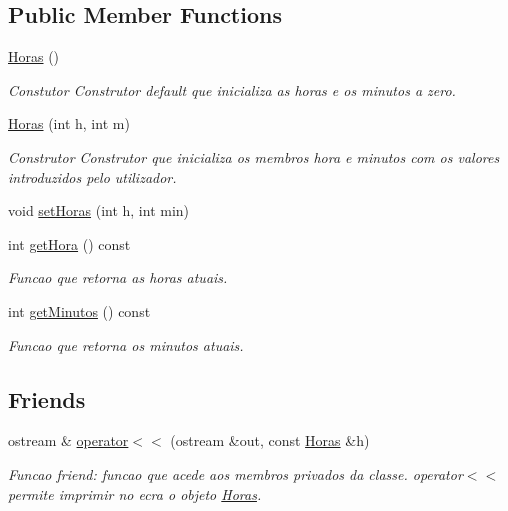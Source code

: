 \subsection*{Public Member Functions}
\begin{DoxyCompactItemize}
\item 
\hypertarget{class_horas_aeef70cbde1c7253dfbb2135fbadc483b}{}\hyperlink{class_horas_aeef70cbde1c7253dfbb2135fbadc483b}{Horas} ()\label{class_horas_aeef70cbde1c7253dfbb2135fbadc483b}

\begin{DoxyCompactList}\small\item\em Constutor Construtor default que inicializa as horas e os minutos a zero. \end{DoxyCompactList}\item 
\hypertarget{class_horas_abbbba3d917352ba3350cafe29753c60f}{}\hyperlink{class_horas_abbbba3d917352ba3350cafe29753c60f}{Horas} (int h, int m)\label{class_horas_abbbba3d917352ba3350cafe29753c60f}

\begin{DoxyCompactList}\small\item\em Construtor Construtor que inicializa os membros hora e minutos com os valores introduzidos pelo utilizador. \end{DoxyCompactList}\item 
void \hyperlink{class_horas_a5da58fcd1a263e3c97e6e11c35b61d76}{set\+Horas} (int h, int min)
\item 
int \hyperlink{class_horas_af72b7e4e7206236f8dc9a4d4b68eff0c}{get\+Hora} () const 
\begin{DoxyCompactList}\small\item\em Funcao que retorna as horas atuais. \end{DoxyCompactList}\item 
int \hyperlink{class_horas_a51e1dd7ac2811960ac1c2faacd034a3c}{get\+Minutos} () const 
\begin{DoxyCompactList}\small\item\em Funcao que retorna os minutos atuais. \end{DoxyCompactList}\end{DoxyCompactItemize}
\subsection*{Friends}
\begin{DoxyCompactItemize}
\item 
ostream \& \hyperlink{class_horas_ad76a7152a5b1492bcda5507aa928db73}{operator$<$$<$} (ostream \&out, const \hyperlink{class_horas}{Horas} \&h)
\begin{DoxyCompactList}\small\item\em Funcao friend\+: funcao que acede aos membros privados da classe. operator$<$$<$ permite imprimir no ecra o objeto \hyperlink{class_horas}{Horas}. \end{DoxyCompactList}\end{DoxyCompactItemize}


